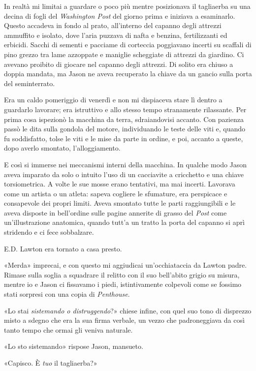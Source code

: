 In realtà mi limitai a guardare o poco più mentre posizionava il
tagliaerba su una decina di fogli del \emph{Washington Post} del giorno
prima e iniziava a esaminarlo. Questo accadeva in fondo al prato,
all'interno del capanno degli attrezzi ammuffito e isolato, dove l'aria
puzzava di nafta e benzina, fertilizzanti ed erbicidi. Sacchi di sementi
e pacciame di corteccia poggiavano incerti su scaffali di pino grezzo
tra lame azzoppate e maniglie scheggiate di attrezzi da giardino. Ci
avevano proibito di giocare nel capanno degli attrezzi. Di solito era
chiuso a doppia mandata, ma Jason ne aveva recuperato la chiave da un
gancio sulla porta del seminterrato.

Era un caldo pomeriggio di venerdì e non mi dispiaceva stare lì dentro a
guardarlo lavorare; era istruttivo e allo stesso tempo stranamente
rilassante. Per prima cosa ispezionò la macchina da terra, sdraiandovisi
accanto. Con pazienza passò le dita sulla gondola del motore,
individuando le teste delle viti e, quando fu soddisfatto, tolse le viti
e le mise da parte in ordine, e poi, accanto a queste, dopo averlo
smontato, l'alloggiamento.

E così si immerse nei meccanismi interni della macchina. In qualche modo
Jason aveva imparato da solo o intuito l'uso di un cacciavite a
cricchetto e una chiave torsiometrica. A volte le sue mosse erano
tentativi, ma mai incerti. Lavorava come un artista o un atleta: sapeva
cogliere le sfumature, era perspicace e consapevole dei propri limiti.
Aveva smontato tutte le parti raggiungibili e le aveva disposte in
bell'ordine sulle pagine annerite di grasso del \emph{Post} come
un'illustrazione anatomica, quando tutt'a un tratto la porta del capanno
si aprì stridendo e ci fece sobbalzare.

E.D. Lawton era tornato a casa presto.

«Merda» imprecai, e con questo mi aggiudicai un'occhiataccia da Lawton
padre. Rimase sulla soglia a squadrare il relitto con il suo bell'abito
grigio su misura, mentre io e Jason ci fissavamo i piedi, istintivamente
colpevoli come se fossimo stati sorpresi con una copia di
\emph{Penthouse}.

«Lo stai \emph{sistemando o distruggendo}?» chiese infine, con quel suo
tono di disprezzo misto a sdegno che era la sua firma verbale, un vezzo
che padroneggiava da così tanto tempo che ormai gli veniva naturale.

«Lo sto sistemando» rispose Jason, mansueto.

«Capisco. È \emph{tuo} il tagliaerba?»

